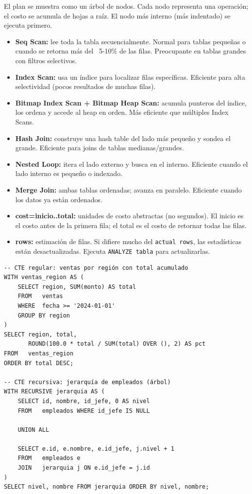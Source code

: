 El plan se muestra como un árbol de nodos.
Cada nodo representa una operación; el costo se acumula de hojas a raíz.
El nodo más interno (más indentado) se ejecuta primero.

\begin{itemize}
  \item \textbf{Seq Scan:} lee toda la tabla secuencialmente. Normal para tablas pequeñas o cuando se retorna más del ~5-10\% de las filas. Preocupante en tablas grandes con filtros selectivos.
  \item \textbf{Index Scan:} usa un índice para localizar filas específicas. Eficiente para alta selectividad (pocos resultados de muchas filas).
  \item \textbf{Bitmap Index Scan + Bitmap Heap Scan:} acumula punteros del índice, los ordena y accede al heap en orden. Más eficiente que múltiples Index Scans.
  \item \textbf{Hash Join:} construye una hash table del lado más pequeño y sondea el grande. Eficiente para joins de tablas medianas/grandes.
  \item \textbf{Nested Loop:} itera el lado externo y busca en el interno. Eficiente cuando el lado interno es pequeño o indexado.
  \item \textbf{Merge Join:} ambas tablas ordenadas; avanza en paralelo. Eficiente cuando los datos ya están ordenados.
  \item \textbf{cost=inicio..total:} unidades de costo abstractas (no segundos). El inicio es el costo antes de la primera fila; el total es el costo de retornar todas las filas.
  \item \textbf{rows:} estimación de filas. Si difiere mucho del \texttt{actual rows}, las estadísticas están desactualizadas. Ejecuta \texttt{ANALYZE tabla} para actualizarlas.
\end{itemize}

\begin{lstlisting}[caption={CTEs --- regular y recursiva}]
-- CTE regular: ventas por región con total acumulado
WITH ventas_region AS (
    SELECT region, SUM(monto) AS total
    FROM   ventas
    WHERE  fecha >= '2024-01-01'
    GROUP BY region
)
SELECT region, total,
       ROUND(100.0 * total / SUM(total) OVER (), 2) AS pct
FROM   ventas_region
ORDER BY total DESC;

-- CTE recursiva: jerarquía de empleados (árbol)
WITH RECURSIVE jerarquia AS (
    SELECT id, nombre, id_jefe, 0 AS nivel
    FROM   empleados WHERE id_jefe IS NULL

    UNION ALL

    SELECT e.id, e.nombre, e.id_jefe, j.nivel + 1
    FROM   empleados e
    JOIN   jerarquia j ON e.id_jefe = j.id
)
SELECT nivel, nombre FROM jerarquia ORDER BY nivel, nombre;
\end{lstlisting}

